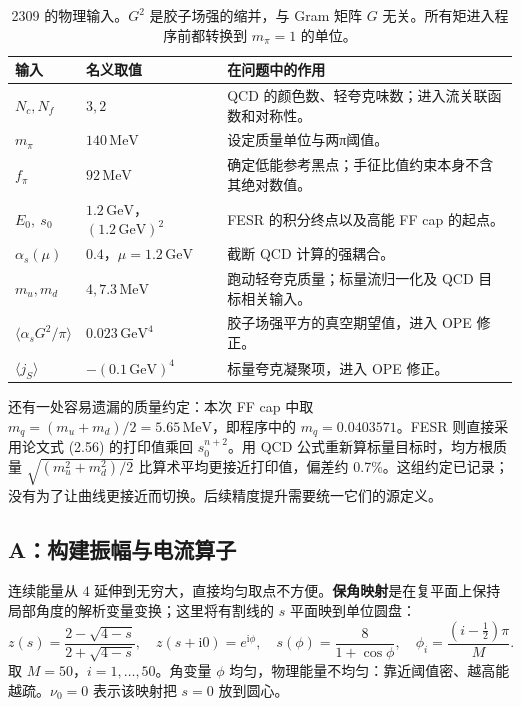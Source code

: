 \documentclass[UTF8,a4paper,11pt,fontset=fandol]{ctexart}
\numberwithin{equation}{section}
\newcommand{\ii}{\mathrm i}
\newcommand{\GeV}{\,\mathrm{GeV}}
\newcommand{\MeV}{\,\mathrm{MeV}}
\begin{document}
\begin{table}[H]\centering\small
\begin{tabularx}{\linewidth}{P{27mm}P{38mm}Y}
\toprule
输入 & 名义取值 & 在问题中的作用\\
\midrule
\(N_c,N_f\) & \(3,2\) & QCD 的颜色数、轻夸克味数；进入流关联函数和对称性。\\
\(m_\pi\) & \(140\MeV\) & 设定质量单位与两π阈值。\\
\(f_\pi\) & \(92\MeV\) & 确定低能参考黑点；手征比值约束本身不含其绝对数值。\\
\(E_0,\ s_0\) & \(1.2\GeV\)，\((1.2\GeV)^2\) & FESR 的积分终点以及高能 FF cap 的起点。\\
\(\alpha_s(\mu)\) & \(0.4\)，\(\mu=1.2\GeV\) & 截断 QCD 计算的强耦合。\\
\(m_u,m_d\) & \(4,7.3\MeV\) & 跑动轻夸克质量；标量流归一化及 QCD 目标相关输入。\\
\(\langle\alpha_sG^2/\pi\rangle\) & \(0.023\GeV^4\) & 胶子场强平方的真空期望值，进入 OPE 修正。\\
\(\langle j_S\rangle\) & \(-(0.1\GeV)^4\) & 标量夸克凝聚项，进入 OPE 修正。\\
\bottomrule
\end{tabularx}
\caption{2309 的物理输入。\(G^2\) 是胶子场强的缩并，与 Gram 矩阵 \(G\) 无关。所有矩进入程序前都转换到 \(m_\pi=1\) 的单位。}\label{tab:physical}
\end{table}

还有一处容易遗漏的质量约定：本次 FF cap 中取 \(m_q=(m_u+m_d)/2=5.65\MeV\)，即程序中的 \(m_q=0.0403571\)。FESR 则直接采用论文式 (2.56) 的打印值乘回 \(s_0^{n+2}\)。用 QCD 公式重新算标量目标时，均方根质量 \(\sqrt{(m_u^2+m_d^2)/2}\) 比算术平均更接近打印值，偏差约 0.7\%。这组约定已记录；没有为了让曲线更接近而切换。后续精度提升需要统一它们的源定义。

\subsection{A：构建振幅与电流算子}
连续能量从 \(4\) 延伸到无穷大，直接均匀取点不方便。\textbf{保角映射}是在复平面上保持局部角度的解析变量变换；这里将有割线的 \(s\) 平面映到单位圆盘：
\begin{equation}\label{eq:grid}
z(s)=\frac{2-\sqrt{4-s}}{2+\sqrt{4-s}},\quad
z(s+\ii0)=e^{\ii\phi},\quad
s(\phi)=\frac8{1+\cos\phi},\quad
\phi_i=\frac{(i-\tfrac12)\pi}{M}.
\end{equation}
取 \(M=50\)，\(i=1,\ldots,50\)。角变量 \(\phi\) 均匀，物理能量不均匀：靠近阈值密、越高能越疏。\(\nu_0=0\) 表示该映射把 \(s=0\) 放到圆心。
\end{document}
